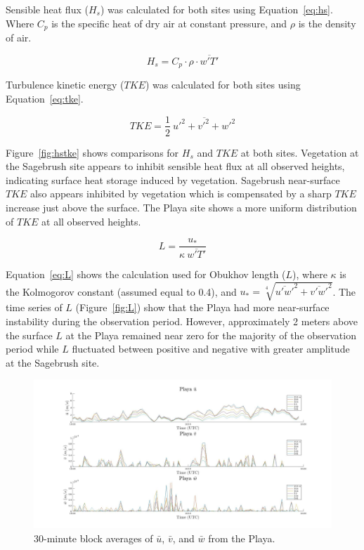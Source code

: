 \documentclass[]{article}
\begin{document}
Sensible heat flux ($H_s$) was calculated for both sites using Equation~\ref{eq:hs}. Where $C_p$ is the specific heat of dry air at constant pressure, and $\rho$ is the density of air.

\begin{equation}
H_s = C_p \cdot \rho \cdot \overline{w'T'}
\label{eq:hs}
\end{equation}

Turbulence kinetic energy ($TKE$) was calculated for both sites using Equation~\ref{eq:tke}. 

\begin{equation}
TKE = \frac{1}{2}~ \overline{u'^2 + v'^2 + w'^2}
\label{eq:tke}
\end{equation}

Figure~\ref{fig:hstke} shows comparisons for $H_s$ and $TKE$ at both sites. Vegetation at the Sagebrush site appears to inhibit sensible heat flux at all observed heights, indicating surface heat storage induced by vegetation. Sagebrush near-surface $TKE$ also appears inhibited by vegetation which is compensated by a sharp $TKE$ increase just above the surface. The Playa site shows a more uniform distribution of $TKE$ at all observed heights.

\begin{equation}
L = \frac{u_*}{\kappa~ \overline{w'T'}}
\label{eq:L}
\end{equation}

Equation~\ref{eq:L} shows the calculation used for Obukhov length ($L$), where $\kappa$ is the Kolmogorov constant (assumed equal to 0.4), and $u_* = \sqrt[4]{\overline{u'w'}^2 + \overline{v'w'}^2}$. The time series of $L$ (Figure~\ref{fig:L}) show that the Playa had more near-surface instability during the observation period. However, approximately 2 meters above the surface $L$ at the Playa remained near zero for the majority of the observation period while $L$ fluctuated between positive and negative with greater amplitude at the Sagebrush site. 

\begin{figure}
	\centering
	\includegraphics[width=\textwidth]{playarotate}
	\caption{30-minute block averages of $\bar{u}$, $\bar{v}$, and $\bar{w}$ from the Playa.}
	\label{fig:playarotate}
\end{figure}
\end{document}
